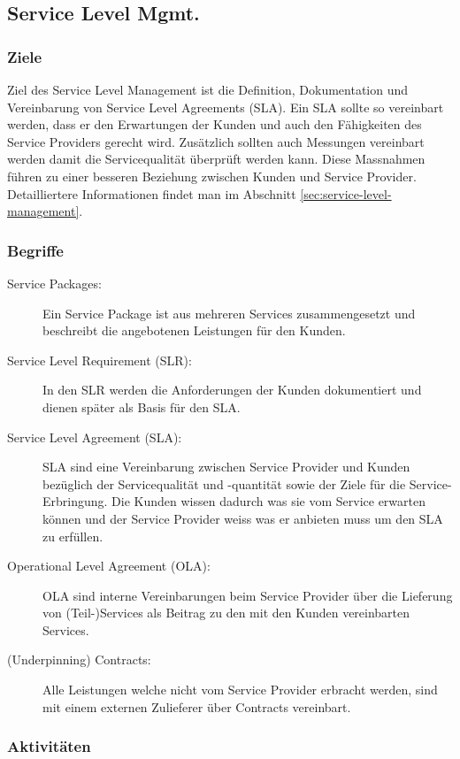\subsection{Service Level Mgmt.}

\subsubsection{Ziele}

Ziel des Service Level Management ist die Definition, Dokumentation und Vereinbarung von Service Level Agreements (SLA). Ein SLA sollte so vereinbart werden, dass er den Erwartungen der Kunden und auch den Fähigkeiten des Service Providers gerecht wird. Zusätzlich sollten auch Messungen vereinbart werden damit die Servicequalität überprüft werden kann. Diese Massnahmen führen zu einer besseren Beziehung zwischen Kunden und Service Provider. Detailliertere Informationen findet man im Abschnitt \ref{sec:service-level-management}.

\subsubsection{Begriffe}

\begin{description}
	\item[Service Packages:] Ein Service Package ist aus mehreren Services zusammengesetzt und beschreibt die angebotenen Leistungen für den Kunden.
	\item[Service Level Requirement (SLR):] In den SLR werden die Anforderungen der Kunden dokumentiert und dienen später als Basis für den SLA.
	\item[Service Level Agreement (SLA):] SLA sind eine Vereinbarung zwischen Service Provider und Kunden bezüglich der Servicequalität und -quantität sowie der Ziele für die Service-Erbringung. Die Kunden wissen dadurch was sie vom Service erwarten können und der Service Provider weiss was er anbieten muss um den SLA zu erfüllen.
	\item[Operational Level Agreement (OLA):] OLA sind interne Vereinbarungen beim Service Provider über die Lieferung von (Teil-)Services als Beitrag zu den mit den Kunden vereinbarten Services.
	\item[(Underpinning) Contracts:] Alle Leistungen welche nicht vom Service Provider erbracht werden, sind mit einem externen Zulieferer über Contracts vereinbart.
\end{description}

\subsubsection{Aktivitäten}

